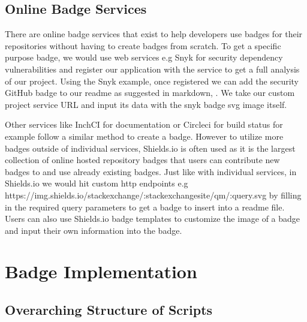 \documentclass[12pt, letterpaper]{article}
\begin{document}
\subsection{Online Badge Services}
There are online badge services that exist to help developers use badges for their
repositories without having to create badges from scratch. To get a specific purpose badge,
we would use web services e.g Snyk for security dependency vulnerabilities \cite{snyk} and register
our application with the service to get a full analysis of our project. 
Using the Snyk example, once registered we can add the security GitHub badge to our readme as
suggested in markdown, 
\cite{snyk}. 
We take our custom project service URL and input its data with the snyk badge svg image itself.


Other services like InchCI for documentation \cite{inchci} or Circleci for build status \cite{circleci} for example
follow a similar method to create a badge. 
However to utilize more badges outside of individual services, Shields.io \cite{shields} is often used
as it is the largest collection
of online hosted repository badges that users can contribute new badges to and use already
existing badges. Just like with individual services, in Shields.io \cite{shields} we would hit custom
http endpoints e.g https://img.shields.io/stackexchange/:stackexchangesite/qm/:query.svg \cite{shields} 
by filling in the 
required query parameters to get a badge to insert into a readme file. 
Users can also use Shields.io \cite{shields} badge templates to customize the image of a badge and 
input their own information into the badge.


\section{Badge Implementation}
\subsection{Overarching Structure of Scripts}
\end{document}
